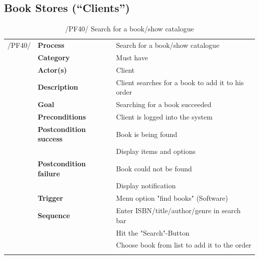 \documentclass[11pt,a4paper,oneside,svgnames]{report}
\begin{document}
\subsection{Book Stores (``Clients'')}

\begin{table}[H]
\centering
\begin{tabular}{p{1.5cm}p{3cm}p{8cm}}
\cellcolor{white}	 /PF40/	& \textbf{Process} & Search for a book/show catalogue\\ 
\cellcolor{white}		& \textbf{Category} & Must have\\
\cellcolor{white}		& \textbf{Actor(s)} & Client\\ 
\cellcolor{white}		& \textbf{Description}	 & Client searches for a book to add it to his order\\ 
\cellcolor{white}		& \textbf{Goal} & Searching for a book succeeded\\
\cellcolor{white}		& \textbf{Preconditions} & Client is logged into the system\\
\cellcolor{white}		& \textbf{Postcondition success} & Book is being found\\
\cellcolor{white}		& & Display items and options\\
\cellcolor{white}		& \textbf{Postcondition failure} & Book could not be found\\
\cellcolor{white}		& & Display notification\\
\cellcolor{white}		& \textbf{Trigger} & Menu option "find books" (Software)\\
\cellcolor{white}		& \textbf{Sequence} & Enter ISBN/title/author/genre in search bar\\
\cellcolor{white}		& & Hit the "Search"-Button\\
\cellcolor{white}		& & Choose book from list to add it to the order\\
\cellcolor{white}\hfill \\
\end{tabular}
\caption{/PF40/ Search for a book/show catalogue}
\label{tab:pf40}
\end{table}
\end{document}
